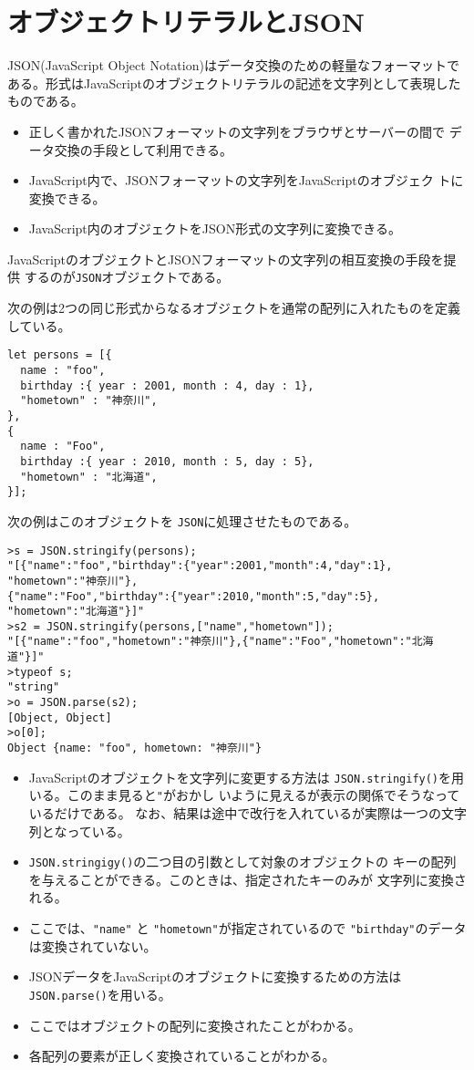 \section{オブジェクトリテラルとJSON}
JSON(JavaScript Object Notation)はデータ交換のための軽量なフォーマットで
ある。形式はJavaScriptのオブジェクトリテラルの記述を文字列として表現した
ものである。
\begin{itemize}
 \item 正しく書かれたJSONフォーマットの文字列をブラウザとサーバーの間で
       データ交換の手段として利用できる。
 \item JavaScript内で、JSONフォーマットの文字列をJavaScriptのオブジェク
       トに変換できる。
 \item JavaScript内のオブジェクトをJSON形式の文字列に変換できる。
\end{itemize}

JavaScriptのオブジェクトとJSONフォーマットの文字列の相互変換の手段を提供
するのが\texttt{JSON}オブジェクトである。

\begin{Exec}\label{JSONExec}\upshape
次の例は2つの同じ形式からなるオブジェクトを通常の配列に入れたものを定義
 している。
\begin{Verbatim}
let persons = [{
  name : "foo",
  birthday :{ year : 2001, month : 4, day : 1},
  "hometown" : "神奈川",
},
{
  name : "Foo",
  birthday :{ year : 2010, month : 5, day : 5},
  "hometown" : "北海道",
}];
\end{Verbatim}
次の例はこのオブジェクトを \texttt{JSON}に処理させたものである。
\begin{Verbatim}
>s = JSON.stringify(persons);
"[{"name":"foo","birthday":{"year":2001,"month":4,"day":1},
"hometown":"神奈川"},
{"name":"Foo","birthday":{"year":2010,"month":5,"day":5},
"hometown":"北海道"}]"
>s2 = JSON.stringify(persons,["name","hometown"]);
"[{"name":"foo","hometown":"神奈川"},{"name":"Foo","hometown":"北海道"}]"
>typeof s;
"string"
>o = JSON.parse(s2);
[Object, Object]
>o[0];
Object {name: "foo", hometown: "神奈川"}
\end{Verbatim}
\begin{itemize}
 \item JavaScriptのオブジェクトを文字列に変更する方法は
       \texttt{JSON.stringify()}を用いる。このまま見ると\verb+"+がおかし
       いように見えるが表示の関係でそうなっているだけである。%
なお、結果は途中で改行を入れているが実際は一つの文字列となっている。
 \item \texttt{JSON.stringigy()}の二つ目の引数として対象のオブジェクトの
       キーの配列を与えることができる。このときは、指定されたキーのみが
       文字列に変換される。
 \item ここでは、\verb+"name"+ と \verb+"hometown"+が指定されているので
\verb+"birthday"+のデータは変換されていない。
 \item JSONデータをJavaScriptのオブジェクトに変換するための方法は
       \texttt{JSON.parse()}を用いる。
 \item ここではオブジェクトの配列に変換されたことがわかる。
 \item 各配列の要素が正しく変換されていることがわかる。
\end{itemize}
\end{Exec}

